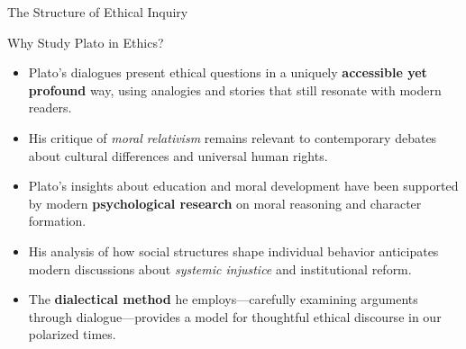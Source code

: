 \documentclass[aspectratio=169]{beamer}
\begin{document}
\begin{frame}{The Structure of Ethical Inquiry}
\begin{center}
\end{center}
\end{frame}

\begin{frame}{Why Study Plato in Ethics?}
\begin{itemize}
\item Plato's dialogues present ethical questions in a uniquely \textbf{accessible yet profound} way, using analogies and stories that still resonate with modern readers.
\item His critique of \emph{moral relativism} remains relevant to contemporary debates about cultural differences and universal human rights.
\item Plato's insights about education and moral development have been supported by modern \textbf{psychological research} on moral reasoning and character formation.
\item His analysis of how social structures shape individual behavior anticipates modern discussions about \emph{systemic injustice} and institutional reform.
\item The \textbf{dialectical method} he employs—carefully examining arguments through dialogue—provides a model for thoughtful ethical discourse in our polarized times.
\end{itemize}
\end{frame}
\end{document}
